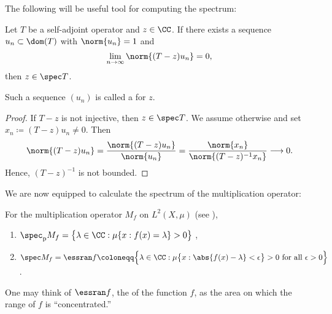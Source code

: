 \documentclass[oneside,reqno,letterpaper]{amsart}
\newcommand{\pspec}{\spec_{\mathrm{p}}}
\begin{document}
The following will be useful tool for computing the spectrum:

\begin{proposition}
\label{thm:weyl-sequence}
  Let \(T\) be a self-adjoint operator and \(z \in \CC\). 
  If there exists a sequence \({u_n} \subset \dom(T)\) with \(\norm{u_n} = 1\) and 
  \[
    \lim_{n \to \infty} \norm{(T - z) u_n} = 0 , 
  \] 
  then \(z \in \spec T\). 
\end{proposition}
Such a sequence \((u_n)\) is called a  for \(z\).
\begin{proof}
  If \(T - z\) is not injective, then \(z \in \spec T\).
  We assume otherwise and set \(x_n \coloneqq (T - z) u_n \neq 0\).
  Then
  \[
    \norm{(T - z) u_n} 
    = \frac{\norm{(T - z) u_n}}{\norm{u_n}} 
    = \frac{\norm{x_n}}{\norm{(T - z)^{-1} x_n}} 
    \longrightarrow 0 . 
  \] 
  Hence, \((T - z)^{-1}\) is not bounded. 
\end{proof}


We are now equipped to calculate the spectrum of the multiplication operator: 
\begin{proposition}
\label{thm:multiplication-operator-spectrum}
  For the multiplication operator \(M_f\) on \(L^2(X, \mu)\) (see ), 
  \begin{enumerate}[label=(\alph*)]
    \item  \(\pspec M_f = \big\{ \lambda \in \CC: \mu\{x: f(x) = \lambda\} > 0 \big\}\) ,  
    \item \(
      \spec M_f 
      = \essran f 
      \coloneqq \Big\{ 
        \lambda \in \CC: 
        \mu\big\{x:\abs{f(x) - \lambda} < \epsilon\big\} > 0 \text{ for all } \epsilon > 0
      \Big\}
      \). 
  \end{enumerate}
\end{proposition}
One may think of \(\essran f\), the  of the function \(f\), as the area on which the range of \(f\) is ``concentrated.''
\end{document}
